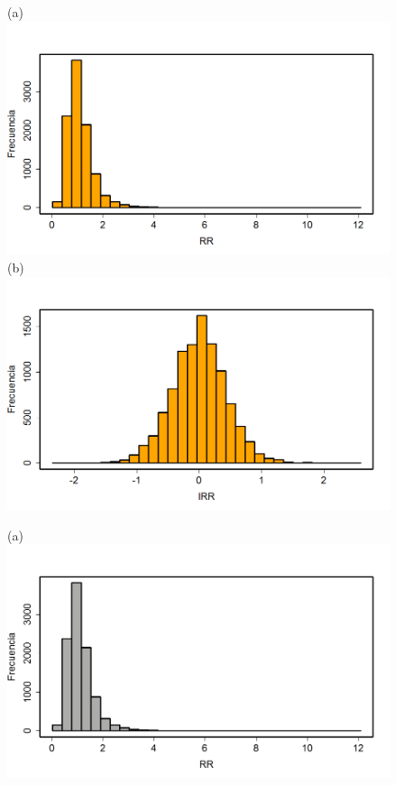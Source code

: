 \begin{ejemplo}
\begin{figure}[p]
\begin{center}
\begin{enColor}
(a)\\[3mm]
\includegraphics[width=13cm]{../fig/Cap09-EjemploLogRR01.png}\\[3mm]
(b)\\[3mm]
\includegraphics[width=13cm]{../fig/Cap09-EjemploLogRR02.png}
\end{enColor}
\begin{bn}
(a)\\[3mm]
\includegraphics[width=13cm]{../fig/Cap09-EjemploLogRR01-bn.png}\\[3mm]

\end{bn}
\end{center}
\end{figure}
\end{ejemplo}
